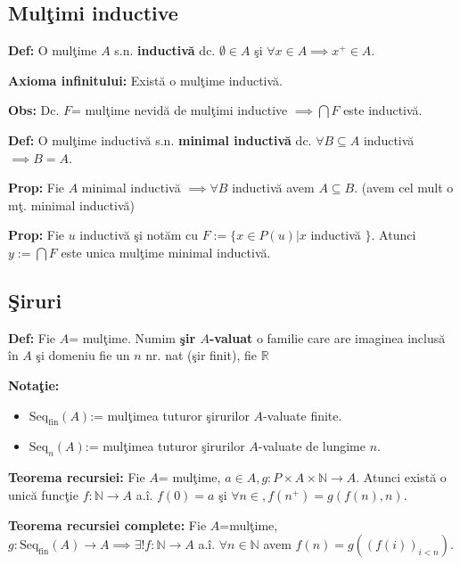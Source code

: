 \documentclass{article}
\begin{document}
\subsection{Mul\c timi inductive}

\textbf{Def:} O mul\c time $A$ s.n. \textbf{inductiv\u a} dc. $\emptyset \in A$ \c si $\forall x\in A \implies x^+ \in A$.

\textbf{Axioma infinitului:} Exist\u a o mul\c time inductiv\u a.

\textbf{Obs:} Dc. $F$= mul\c time nevid\u a de mul\c timi inductive $\implies \bigcap F$ este inductiv\u a.

\textbf{Def:} O mul\c time inductiv\u a s.n. \textbf{minimal inductiv\u a} dc. $\forall B \subseteq A$ inductiv\u a $\implies B=A$.

\textbf{Prop:} Fie $A$ minimal inductiv\u a $\implies \forall B$ inductiv\u a avem $A\subseteq B$. (avem cel mult o m\c t. minimal inductiv\u a)

\textbf{Prop:} Fie $u$ inductiv\u a \c si not\u am cu $F:=\{x\in P(u)|x$ inductiv\u a $\}$. Atunci $y:=\bigcap F$ este unica mul\c time minimal inductiv\u a.

\subsection{\c Siruri}

\textbf{Def:} Fie $A$= mul\c time. Numim \textbf{ \c sir $A$-valuat} o familie care are imaginea inclus\u a \^ in $A$ \c si domeniu fie un $n$ nr. nat (\c sir finit), fie $\mathbb R$

\textbf{Nota\c tie:}
\begin{itemize}
    \item \textbf{$\text{Seq}_\text{fin}(A)$}:= mul\c timea tuturor \c sirurilor $A$-valuate finite.
    \item \textbf{$\text{Seq}_n(A)$}:= mul\c timea tuturor \c sirurilor $A$-valuate de lungime $n$.
\end{itemize}

\textbf{Teorema recursiei:} Fie $A$= mul\c time, $a\in A, g:P\times A\times \mathbb N \rightarrow A$. Atunci exist\u a o unic\u a func\c tie $f: \mathbb{N} \rightarrow A$ a.\^ i. $f(0)=a$ \c si $\forall n\in \mathbb, f(n^+)=g(f(n),n)$.

\textbf{Teorema recursiei complete:} Fie $A$=mul\c time, $g:\text{Seq}_\text{fin}(A)\rightarrow A \implies \exists ! f:\mathbb N \rightarrow A$ a.\^ i. $\forall n\in \mathbb N$ avem $f(n)=g((f(i))_{i<n})$.
\end{document}
